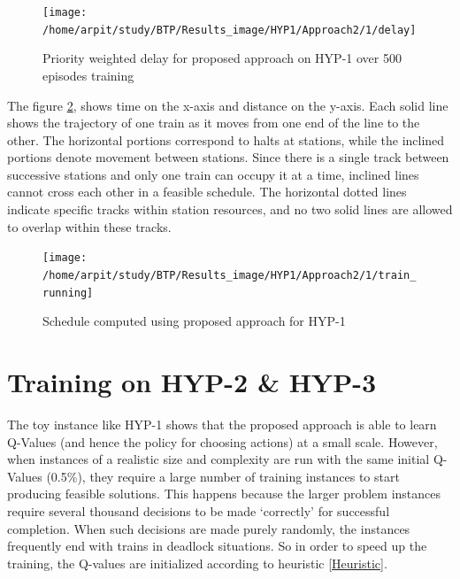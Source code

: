 \begin{figure}[H]
    \centering
    \texttt{[image: /home/arpit/study/BTP/Results\_image/HYP1/Approach2/1/delay]}
    \caption{ Priority weighted delay for proposed approach on HYP-1 over 500 episodes training }
    \label{HYP-1_Approach2_delay}
\end{figure}

The figure \ref{Schedule_HYP-1}, shows time on the x-axis and
distance on the y-axis. Each solid line shows the trajectory of 
one train as it moves from one end of the line to the other. The
horizontal portions correspond to halts at stations, while the
inclined portions denote movement between stations. Since
there is a single track between successive stations and only
one train can occupy it at a time, inclined lines cannot cross
each other in a feasible schedule. The horizontal dotted lines
indicate specific tracks within station resources, and no two
solid lines are allowed to overlap within these tracks.

\begin{figure}[H]
    \centering
    \texttt{[image: /home/arpit/study/BTP/Results\_image/HYP1/Approach2/1/train\_running]}
    \caption{ Schedule computed using proposed approach for HYP-1}
    \label{Schedule_HYP-1}
\end{figure}

\section{Training on HYP-2 \& HYP-3}
The toy instance like HYP-1 shows that the proposed
approach is able to learn Q-Values (and hence the policy for
choosing actions) at a small scale. However, when instances
of a realistic size and complexity are run with the same
initial Q-Values (0.5\%), they require a large number of training
instances to start producing feasible solutions. This happens
because the larger problem instances require several thousand
decisions to be made ‘correctly’ for successful completion.
When such decisions are made purely randomly, the instances
frequently end with trains in deadlock situations. 
So in order to speed up the training, the Q-values are initialized according to heuristic \ref{Heuristic}.

